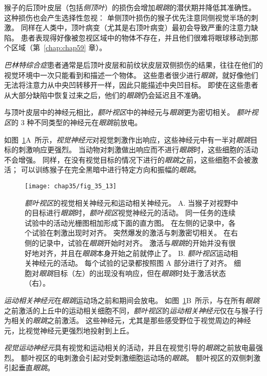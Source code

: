 猴子的后顶叶皮层（包括\textit{侧顶叶}）的损伤会增加\textit{眼跳}的潜伏期并降低其准确性。
这种损伤也会产生选择性忽视：
单侧顶叶损伤的猴子优先注意同侧视觉半场的刺激。
同样在人类中，顶叶病变（尤其是右顶叶病变）最初会导致严重的注意力缺陷。
患者表现得好像被忽视区域中的物体不存在，并且他们很难将眼球移动到那个区域（第~\ref{chap:chap59} 章）。


\textit{巴林特综合症}患者通常是后顶叶皮层和前纹状皮层双侧损伤的结果，往往在他们的视觉环境中一次只能看到和描述一个物体。
这些患者很少进行\textit{眼跳}，就好像他们无法将注意力从中央凹转移开一样，因此只能描述中央凹目标。
即使在这些患者从大部分缺陷中恢复过来之后，他们的\textit{眼跳}仍会延迟且不准确。


与顶叶皮层中的神经元相比，\textit{额叶视区}中的神经元与\textit{眼跳}更为密切相关。
\textit{额叶视区}的 3 种不同类型的神经元在\textit{眼跳}前放电。


如图~\ref{fig:35_13}A~所示，\textit{视觉神经元}对视觉刺激作出响应，这些神经元中有一半对\textit{眼跳}目标的刺激响应更强烈。
当动物对刺激做出响应而不进行\textit{眼跳}时，这些细胞的活动不会增强。
同样，在没有视觉目标的情况下进行的\textit{眼跳}之前，这些细胞不会被激活；
可以训练猴子在完全黑暗中进行特定方向和振幅的\textit{眼跳}。


\begin{figure}[htbp]
	\centering
	\texttt{[image: chap35/fig\_35\_13]}
	\caption{\textit{额叶视区}的视觉相关神经元和运动相关神经元\cite{bruce1985primate}。
		A. 当猴子对视野中的目标进行\textit{眼跳}时，\textit{额叶视区}视觉神经元的活动。
		同一任务的连续试验中的活动光栅图相加形成下面的直方图。
		在左侧的记录中，各个试验在刺激出现时对齐。
		突然爆发的激活与刺激密切相关。
		在右侧的记录中，试验在\textit{眼跳}开始时对齐。
		激活与\textit{眼跳}的开始并没有很好地对齐，并且在\textit{眼跳}本身开始之前就停止了。
		B. \textit{额叶视区}运动相关神经元的活动。
		每个试验的记录都按照图 A 部分进行了对齐。
		细胞对\textit{眼跳}目标（左）的出现没有响应，但在\textit{眼跳}时处于激活状态（右）。}
	\label{fig:35_13}
\end{figure}


\textit{运动相关神经元}在\textit{眼跳}运动场之前和期间会放电。
如图~\ref{fig:35_13}B~所示，与在所有\textit{眼跳}之前激活的上丘中的运动相关细胞不同，\textit{额叶视区}的\textit{运动相关神经元}仅在与猴子行为相关的\textit{眼跳}之前激活。
这些神经元，尤其是那些感受野位于视觉周边的神经元，比视觉神经元更强烈地投射到上丘。


\textit{视觉运动神经元}具有视觉和运动相关的活动，并且在视觉引导的\textit{眼跳}之前放电最强烈。
额叶视区的电刺激会引起对受刺激细胞运动场的\textit{眼跳}。
额叶视区的双侧刺激引起垂直\textit{眼跳}。


